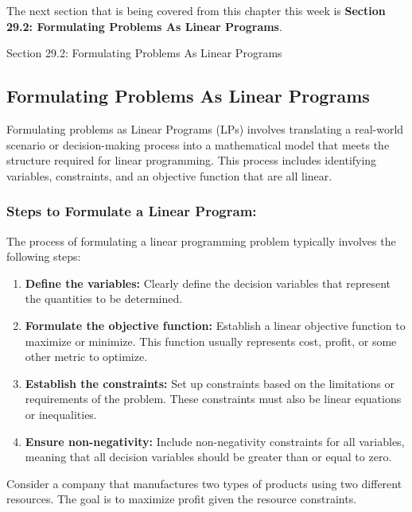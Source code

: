The next section that is being covered from this chapter this week is \textbf{Section 29.2: Formulating Problems As Linear Programs}.

\begin{notes}{Section 29.2: Formulating Problems As Linear Programs}
    \subsection*{Formulating Problems As Linear Programs}

    Formulating problems as Linear Programs (LPs) involves translating a real-world scenario or decision-making process into a mathematical model that meets the structure required for linear programming. 
    This process includes identifying variables, constraints, and an objective function that are all linear. \vspace*{1em}
    
    \subsubsection*{Steps to Formulate a Linear Program:}
    
    The process of formulating a linear programming problem typically involves the following steps:
    
    \begin{enumerate}
        \item \textbf{Define the variables:} Clearly define the decision variables that represent the quantities to be determined.
        \item \textbf{Formulate the objective function:} Establish a linear objective function to maximize or minimize. This function usually represents cost, profit, or some other metric to optimize.
        \item \textbf{Establish the constraints:} Set up constraints based on the limitations or requirements of the problem. These constraints must also be linear equations or inequalities.
        \item \textbf{Ensure non-negativity:} Include non-negativity constraints for all variables, meaning that all decision variables should be greater than or equal to zero.
    \end{enumerate}

    \begin{highlight}
        Consider a company that manufactures two types of products using two different resources. The goal is to maximize profit given the resource constraints.
        

\end{highlight}
\end{notes}
